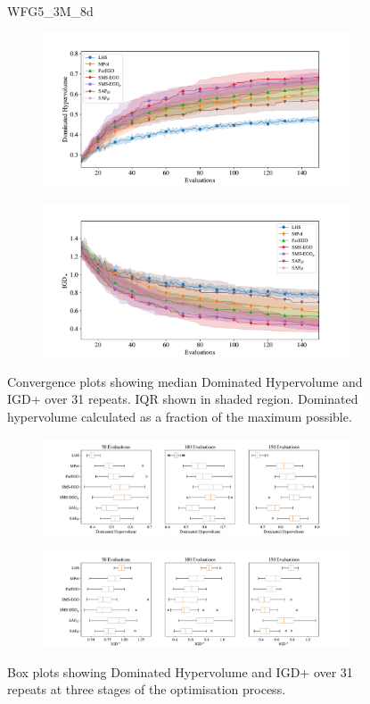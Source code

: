 \documentclass[conference]{IEEEtran}
\begin{document}
\clearpage

\begin{figure}
WFG5\_3M\_8d


\begin{subfigure}[hbt!]{\linewidth}

    \centering
    \includegraphics[width=0.7\linewidth]{figures/wfg5_3obj_8dim_hv_plot.pdf}
\end{subfigure}
\begin{subfigure}[h]{\linewidth}
    \centering
    \includegraphics[width=0.7\linewidth]{figures/wfg5_3obj_8dim_igd_plot.pdf}
\end{subfigure}
    \caption{Convergence plots showing median Dominated Hypervolume and IGD+ over 31 repeats. IQR shown in shaded region. Dominated hypervolume calculated as a fraction of the maximum possible.}
\vspace{\floatsep}
\begin{subfigure}[t]{\linewidth}
    \centering
    \includegraphics[width=0.8\linewidth]{figures/wfg5_3obj_8dim_hv_boxplot.pdf}
\end{subfigure}
\begin{subfigure}[t]{\linewidth}
    \centering
    \includegraphics[width=0.8\linewidth]{figures/wfg5_3obj_8dim_igd_boxplot.pdf}
\end{subfigure}
    \caption{Box plots showing Dominated Hypervolume and IGD+ over 31 repeats at three stages of the optimisation process.}
\end{figure}
\clearpage
\end{document}
